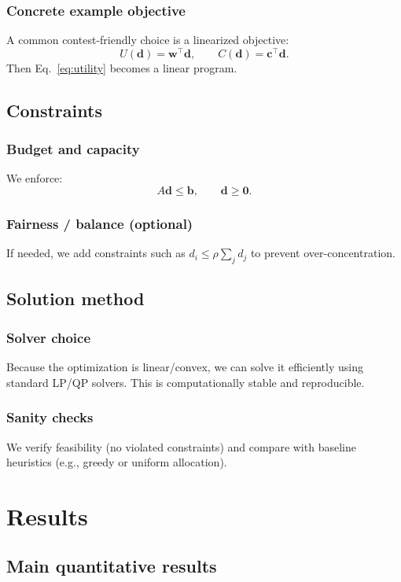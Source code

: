 \documentclass[12pt]{article}
\newcommand{\vect}[1]{\boldsymbol{#1}}
\begin{document}
\subsubsection{Concrete example objective}
A common contest-friendly choice is a linearized objective:
\[
U(\vect{d})=\vect{w}^\top \vect{d},\qquad C(\vect{d})=\vect{c}^\top \vect{d}.
\]
Then Eq.~\eqref{eq:utility} becomes a linear program.

\subsection{Constraints}
\subsubsection{Budget and capacity}
We enforce:
\begin{equation}
A\vect{d}\le\vect{b},\qquad \vect{d}\ge \vect{0}.
\label{eq:constraints}
\end{equation}

\subsubsection{Fairness / balance (optional)}
If needed, we add constraints such as $d_i\le \rho \sum_j d_j$ to prevent over-concentration.

\subsection{Solution method}
\subsubsection{Solver choice}
Because the optimization is linear/convex, we can solve it efficiently using standard LP/QP solvers.
This is computationally stable and reproducible.

\subsubsection{Sanity checks}
We verify feasibility (no violated constraints) and compare with baseline heuristics (e.g., greedy or uniform allocation).

\section{Results}
\subsection{Main quantitative results}
\end{document}
